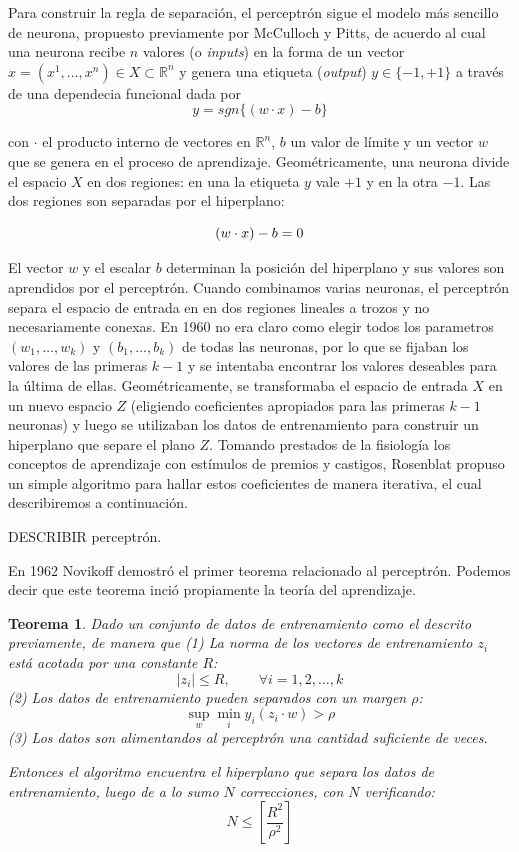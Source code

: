 \documentclass{article}
\newtheorem{thm}{Teorema}[subsection]
\begin{document}
Para construir la regla de separación, el perceptrón sigue el modelo más sencillo de neurona, propuesto previamente por McCulloch y Pitts, de acuerdo al cual una neurona recibe
\(n\) valores (o \textit{inputs}) en la forma de un vector \(x = (x^1,\dots, x^n) \in X \subset \mathbb{R}^n \) y genera una etiqueta (\textit{output}) 
\(y\in\{-1,+1\}\) a través de una dependecia funcional dada por
\[
y = sgn\{(w\cdot x)-b\}
\]

con \(\cdot\) el producto interno de vectores en \(\mathbb{R}^n\), \(b\) un valor de límite y un vector \(w\) que se genera en el proceso de aprendizaje. Geométricamente, una 
neurona divide el espacio \(X\) en dos regiones: en una la etiqueta \(y\) vale \(+1\) y en la otra \(-1\). Las dos regiones son separadas por el hiperplano:\newline

\[
(w\cdot x) - b = 0 \newline
\]

El vector \(w\) y el escalar \(b\) determinan la posición del hiperplano y sus valores son aprendidos por el perceptrón. Cuando combinamos varias neuronas, el perceptrón
separa el espacio de entrada en en dos regiones lineales a trozos y no necesariamente conexas. En 1960 no era claro como elegir todos los parametros \((w_1,\dots,w_k)\) y
\((b_1,\dots, b_k)\) de todas las neuronas, por lo que se fijaban los valores de las primeras \(k-1\) y se intentaba encontrar los valores deseables para la última
de ellas. Geométricamente, se transformaba el espacio de entrada $X$ en un nuevo espacio $Z$ (eligiendo coeficientes apropiados para las primeras $k-1$ neuronas) y luego
se utilizaban los datos de entrenamiento para construir un hiperplano que separe el plano $Z$.
Tomando prestados de la fisiología los conceptos de aprendizaje con estímulos de premios y castigos, Rosenblat propuso un simple algoritmo para hallar estos 
coeficientes de manera iterativa, el cual describiremos a continuación.\newline

DESCRIBIR perceptrón.\newline

En 1962 Novikoff demostró el primer teorema relacionado al perceptrón. Podemos decir que este teorema inció propiamente la teoría del aprendizaje.

\begin{thm}
Dado un conjunto de datos de entrenamiento como el descrito previamente, de manera que\newline
(1) La norma de los vectores de entrenamiento $z_i$ está acotada por una constante $R$:
\[
|z_i| \leq R, \qquad \forall i=1,2,\dots,k
\]
(2) Los datos de entrenamiento pueden separados con un margen $\rho$:
\[
\sup_{w} \min_{i} y_i(z_i\cdot w) > \rho
\]
(3) Los datos son alimentandos al perceptrón una cantidad \textit{suficiente} de veces.

Entonces el algoritmo encuentra el hiperplano que separa los datos de entrenamiento, luego de a lo
sumo $N$ correcciones, con $N$ verificando:
\[
N \leq \left [ \frac{R^2}{\rho^2}\right ]
\]

\end{thm}
\end{document}
